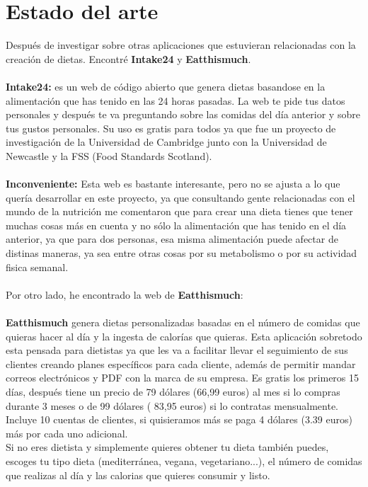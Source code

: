 \chapter{Estado del arte}

Después de investigar sobre otras aplicaciones que estuvieran relacionadas con la creación de dietas. Encontré \textbf{Intake24}\cite{Intake24} y \textbf{Eatthismuch}\cite{Eatthismuch}. 
\\\\
\textbf{Intake24:} es un web de código abierto que genera dietas basandose en la alimentación que has tenido en las 24 horas pasadas.
La web te pide tus datos personales y después te va preguntando sobre las comidas del día anterior y sobre tus gustos personales.
Su uso es gratis para todos ya que fue un proyecto de investigación de la Universidad de Cambridge junto con la Universidad de Newcastle y 
la FSS (Food Standards Scotland).
\\\\
\textbf{Inconveniente:}
Esta web es bastante interesante, pero no se ajusta a lo que quería desarrollar en este proyecto, ya que consultando gente relacionadas
con el mundo de la nutrición me comentaron que para crear una dieta tienes que tener muchas cosas más en cuenta y no sólo
la alimentación que has tenido en el día anterior, ya que para dos personas, esa misma alimentación puede afectar de distinas maneras,
ya sea entre otras cosas por su metabolismo o por su actividad fisica semanal.
\\\\
Por otro lado, he encontrado la web de \textbf{Eatthismuch}:
\\\\
\textbf{Eatthismuch} genera dietas personalizadas basadas en el número de comidas que quieras hacer al día y la ingesta de calorías que quieras.
Esta aplicación sobretodo esta pensada para dietistas ya que les va a facilitar llevar el seguimiento de sus clientes creando planes específicos
para cada cliente, además de permitir mandar correos electrónicos y PDF con la marca de su empresa.
Es gratis los primeros 15 días, después tiene un precio de 79 dólares (66,99 euros) al mes si lo compras durante 3 meses o de 99 dólares ( 83,95 euros) si lo contratas mensualmente.
Incluye 10 cuentas de clientes, si quisieramos más se paga 4 dólares (3.39 euros) más por cada uno adicional.\\
Si no eres dietista y simplemente quieres obtener tu dieta también puedes, escoges tu tipo dieta (mediterránea, vegana, vegetariano...), el número de comidas que realizas al día y las calorias que quieres consumir y listo.
